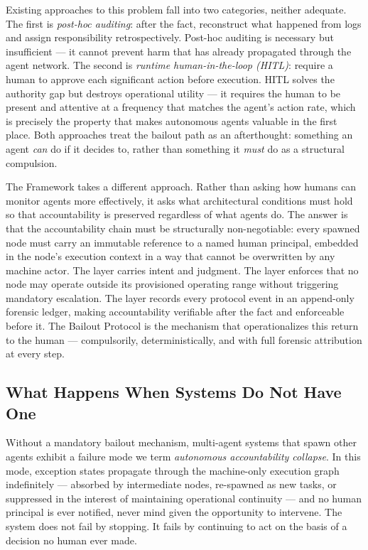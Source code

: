 Existing approaches to this problem fall into two categories, neither adequate. The first is \emph{post-hoc auditing}: after the fact, reconstruct what happened from logs and assign responsibility retrospectively. Post-hoc auditing is necessary but insufficient — it cannot prevent harm that has already propagated through the agent network. The second is \emph{runtime human-in-the-loop (HITL)}: require a human to approve each significant action before execution. HITL solves the authority gap but destroys operational utility — it requires the human to be present and attentive at a frequency that matches the agent's action rate, which is precisely the property that makes autonomous agents valuable in the first place. Both approaches treat the bailout path as an afterthought: something an agent \emph{can} do if it decides to, rather than something it \emph{must} do as a structural compulsion.

The \bxthree{} Framework takes a different approach. Rather than asking how humans can monitor agents more effectively, it asks what architectural conditions must hold so that accountability is preserved regardless of what agents do. The answer is that the accountability chain must be structurally non-negotiable: every spawned node must carry an immutable reference to a named human principal, embedded in the node's execution context in a way that cannot be overwritten by any machine actor. The \purpose{} layer carries intent and judgment. The \bounds{} layer enforces that no node may operate outside its provisioned operating range without triggering mandatory escalation. The \fact{} layer records every protocol event in an append-only forensic ledger, making accountability verifiable after the fact and enforceable before it. The Bailout Protocol is the mechanism that operationalizes this return to the human — compulsorily, deterministically, and with full forensic attribution at every step.

\subsection{What Happens When Systems Do Not Have One}

Without a mandatory bailout mechanism, multi-agent systems that spawn other agents exhibit a failure mode we term \emph{autonomous accountability collapse}. In this mode, exception states propagate through the machine-only execution graph indefinitely — absorbed by intermediate nodes, re-spawned as new tasks, or suppressed in the interest of maintaining operational continuity — and no human principal is ever notified, never mind given the opportunity to intervene. The system does not fail by stopping. It fails by continuing to act on the basis of a decision no human ever made.


